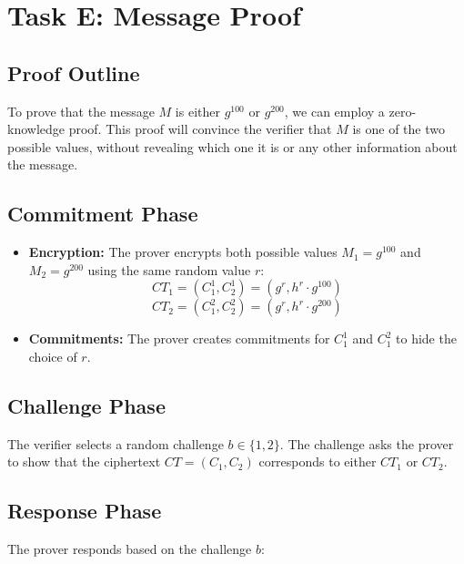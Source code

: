 \documentclass[12pt]{article}
\begin{document}
\section{Task E: Message Proof}



\subsection{Proof Outline}

To prove that the message \( M \) is either \( g^{100} \) or \( g^{200} \), we can employ a zero-knowledge proof. This proof will convince the verifier that \( M \) is one of the two possible values, without revealing which one it is or any other information about the message.

\subsection{Commitment Phase}
\begin{itemize}
    \item \textbf{Encryption:} The prover encrypts both possible values \( M_1 = g^{100} \) and \( M_2 = g^{200} \) using the same random value \( r \):
    \[
    CT_1 = (C_1^1, C_2^1) = (g^r, h^r \cdot g^{100})
    \]
    \[
    CT_2 = (C_1^2, C_2^2) = (g^r, h^r \cdot g^{200})
    \]
    \item \textbf{Commitments:} The prover creates commitments for \( C_1^1 \) and \( C_1^2 \) to hide the choice of \( r \).
\end{itemize}

\subsection{Challenge Phase}
The verifier selects a random challenge \( b \in \{1, 2\} \). The challenge asks the prover to show that the ciphertext \( CT = (C_1, C_2) \) corresponds to either \( CT_1 \) or \( CT_2 \).

\subsection{Response Phase}
The prover responds based on the challenge \( b \):
\end{document}
